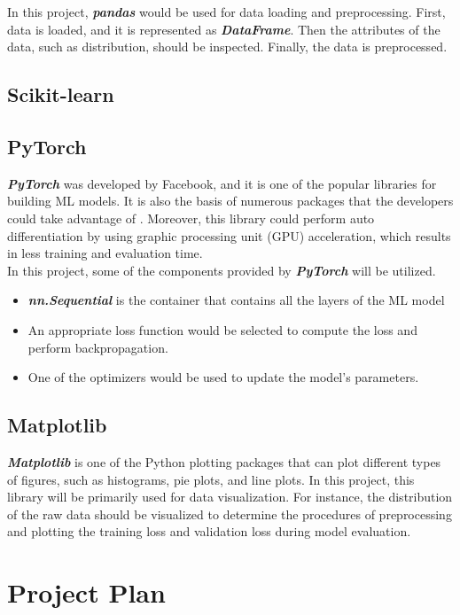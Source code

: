 \documentclass[12pt,twoside]{report}
\begin{document}
In this project, \textbf{\textit{pandas}} would be used for data loading and preprocessing. First, data is loaded, and it is represented as \textbf{\textit{DataFrame}}. Then the attributes of the data, such as distribution, should be inspected. Finally, the data is preprocessed.

\section{Scikit-learn}

\section{PyTorch}
\textbf{\textit{PyTorch}} was developed by Facebook, and it is one of the popular libraries for building ML models. It is also the basis of numerous packages that the developers could take advantage of \citep{RN5}. Moreover, this library could perform auto differentiation by using graphic processing unit (GPU) acceleration, which results in less training and evaluation time. 
\\

In this project, some of the components provided by \textbf{\textit{PyTorch}} will be utilized.
\begin{itemize}
	\item \textbf{\textit{nn.Sequential}} is the container that contains all the layers of the ML model
	\item An appropriate loss function would be selected to compute the loss and perform backpropagation. 
	\item One of the optimizers would be used to update the model's parameters. 
\end{itemize}

\section{Matplotlib}
\textbf{\textit{Matplotlib}} is one of the Python plotting packages that can plot different types of figures, such as histograms, pie plots, and line plots. In this project, this library will be primarily used for data visualization. For instance, the distribution of the raw data should be visualized to determine the procedures of preprocessing and plotting the training loss and validation loss during model evaluation. 



\chapter{Project Plan}
\end{document}
